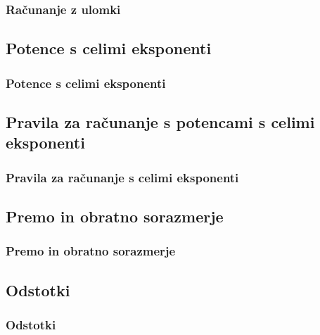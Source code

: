         \begin{frame}
            \frametitle{Računanje z ulomki}
        \end{frame}

    \subsection{Potence s celimi eksponenti}

        \begin{frame}
            \frametitle{Potence s celimi eksponenti}
        \end{frame}

    \subsection{Pravila za računanje s potencami s celimi eksponenti}

        \begin{frame}
            \frametitle{Pravila za računanje s celimi eksponenti}
        \end{frame}

    \subsection{Premo in obratno sorazmerje}

        \begin{frame}
            \frametitle{Premo in obratno sorazmerje}
        \end{frame}

    \subsection{Odstotki}

        \begin{frame}
            \frametitle{Odstotki}
        \end{frame}
